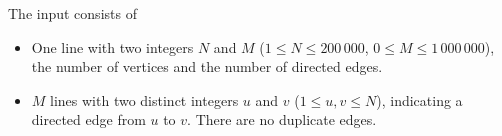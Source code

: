 

The input consists of

\begin{itemize}
  \item One line with two integers $N$ and $M$ ($1 \le N \le 200\,000$, $0 \le M \le 1\,000\,000$), the number of vertices and the number of directed edges.
  \item $M$ lines with two distinct integers $u$ and $v$ ($1 \le u,v \le N$), indicating a directed edge from $u$ to $v$.
    There are no duplicate edges.
\end{itemize}

